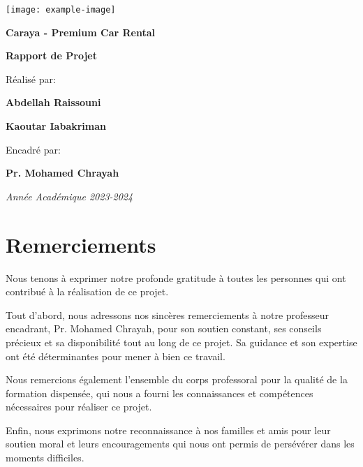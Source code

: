 \documentclass[12pt,a4paper]{report}
\begin{document}
\begin{titlepage}
    \centering
    \vspace*{1cm}
    {\texttt{[image: example-image]}\par}
    \vspace{1.5cm}
    {\huge\bfseries Caraya - Premium Car Rental\par}
    \vspace{1cm}
    {\Large\bfseries Rapport de Projet\par}
    \vspace{1.5cm}
    {\large Réalisé par:\par}
    \vspace{0.5cm}
    {\large\textbf{Abdellah Raissouni}\par}
    {\large\textbf{Kaoutar Iabakriman}\par}
    \vspace{1.5cm}
    {\large Encadré par:\par}
    \vspace{0.5cm}
    {\large\textbf{Pr. Mohamed Chrayah}\par}
    \vfill
    {\large\textit{Année Académique 2023-2024}\par}
\end{titlepage}

\tableofcontents
\newpage

\chapter*{Remerciements}

Nous tenons à exprimer notre profonde gratitude à toutes les personnes qui ont contribué à la réalisation de ce projet.

Tout d'abord, nous adressons nos sincères remerciements à notre professeur encadrant, Pr. Mohamed Chrayah, pour son soutien constant, ses conseils précieux et sa disponibilité tout au long de ce projet. Sa guidance et son expertise ont été déterminantes pour mener à bien ce travail.

Nous remercions également l'ensemble du corps professoral pour la qualité de la formation dispensée, qui nous a fourni les connaissances et compétences nécessaires pour réaliser ce projet.

Enfin, nous exprimons notre reconnaissance à nos familles et amis pour leur soutien moral et leurs encouragements qui nous ont permis de persévérer dans les moments difficiles.
\end{document}
